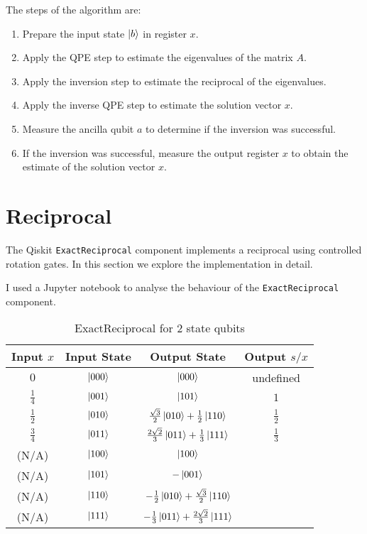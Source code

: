 \documentclass[12pt]{extarticle}
\begin{document}
The steps of the algorithm are:
\begin{enumerate}
    \item Prepare the input state $\ket{b}$ in register $x$.
    \item Apply the QPE step to estimate the eigenvalues of the matrix $A$.
    \item Apply the inversion step to estimate the reciprocal of the eigenvalues.
    \item Apply the inverse QPE step to estimate the solution vector $x$.
    \item Measure the ancilla qubit $a$ to determine if the inversion was successful.
    \item If the inversion was successful, measure the output register $x$ to obtain the estimate of the solution vector $x$.
\end{enumerate}

\section{Reciprocal}\label{sec:reciprocal}

The Qiskit \texttt{ExactReciprocal} component \cite{ibm_exact_reciprocal} implements a reciprocal using controlled rotation gates.
In this section we explore the implementation in detail.

I used a Jupyter notebook \cite{github_project_exactreciprocal} to analyse the behaviour of the \texttt{ExactReciprocal} component.

\begin{table}[h!]
\centering
\begin{tabular}{|c|c|c|c|}
\hline
Input $x$     & Input State  & Output State                                              & Output $s/x$  \\
\hline
$0$           &  $\ket{000}$ &  $\ket{000}$                                              & undefined     \\
$\frac{1}{4}$ &  $\ket{001}$ &  $\ket{101}$                                              & $1$           \\
$\frac{1}{2}$ &  $\ket{010}$ & $\frac{\sqrt{3}}{2} \ket{010} + \frac{1}{2} \ket{110}$    & $\frac{1}{2}$ \\
$\frac{3}{4}$ &  $\ket{011}$ & $\frac{2 \sqrt{2}}{3} \ket{011} + \frac{1}{3} \ket{111}$  & $\frac{1}{3}$ \\
(N/A)         &  $\ket{100}$ & $\ket{100}$                                               & \\
(N/A)         &  $\ket{101}$ & $-\ket{001}$                                              & \\
(N/A)         &  $\ket{110}$ & $-\frac{1}{2} \ket{010} + \frac{\sqrt{3}}{2} \ket{110}$   & \\
(N/A)         &  $\ket{111}$ & $-\frac{1}{3} \ket{011} + \frac{2 \sqrt{2}}{3} \ket{111}$ & \\
\hline
\end{tabular}
\caption{ExactReciprocal for 2 state qubits}
\label{tab:exactreciprocal2}
\end{table}
\end{document}
